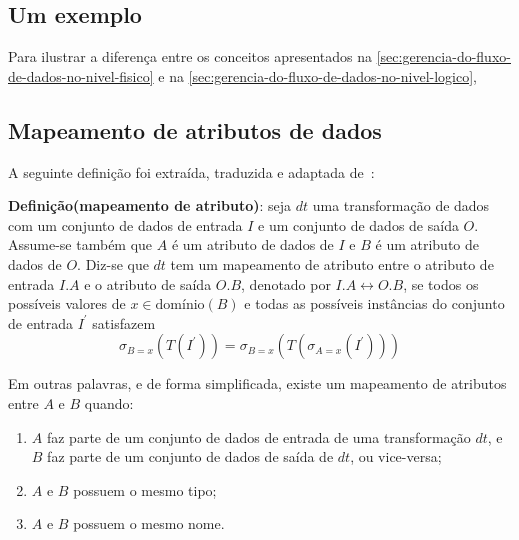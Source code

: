 \subsection{Um exemplo}

Para ilustrar a diferença entre os conceitos apresentados na \autoref{sec:gerencia-do-fluxo-de-dados-no-nivel-fisico} e na \autoref{sec:gerencia-do-fluxo-de-dados-no-nivel-logico}, 



\subsection{Mapeamento de atributos de dados}

A seguinte definição foi extraída, traduzida e adaptada de~\cite{ikeda2013logical}:

\textbf{Definição(mapeamento de atributo)}: seja \( dt \) uma transformação de dados com um conjunto de dados de entrada \( I \) e um conjunto de dados de saída \( O \). Assume-se também que \( A \) é um atributo de dados de \( I \) e \( B \) é um atributo de dados de \( O \). Diz-se que \( dt \) tem um mapeamento de atributo entre o atributo de entrada \( I.A \) e o atributo de saída \( O.B \), denotado por \( I.A \leftrightarrow O.B \), se todos os possíveis valores de \( x \in \textrm{domínio}(B) \) e todas as possíveis instâncias do conjunto de entrada \( I^{\prime} \) satisfazem
\[ \sigma_{B=x}(T(I^{\prime})) = \sigma_{B=x}(T(\sigma_{A=x}(I^{\prime}))) \]


Em outras palavras, e de forma simplificada, existe um mapeamento de atributos entre \( A \) e \( B \) quando:

\begin{enumerate}
    \item \( A \) faz parte de um conjunto de dados de entrada de uma transformação \( dt \), e \( B \) faz parte de um conjunto de dados de saída de \( dt \), ou vice-versa;
    \item \( A \) e \( B \) possuem o mesmo tipo;
    \item \( A \) e \( B \) possuem o mesmo nome.
\end{enumerate}

